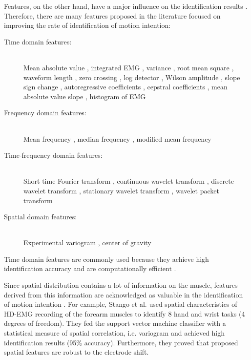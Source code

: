 Features, on the other hand, have a major influence on the identification results \citep{Englehart1999, Tkach2010}. Therefore, there are many features proposed in the literature focused on improving the rate of identification of motion intention:

\begin{description}
\item[Time domain features:] \hfill \\
Mean absolute value \citep{Hudgins1993}, integrated EMG \citep{Park1998}, variance \citep{Park1998, Zardoshti1995}, root mean square \citep{Farrell2008}, waveform length \citep{Hudgins1993}, zero crossing \citep{Hudgins1993}, log detector \citep{Tkach2010}, Wilson amplitude \citep{Zardoshti1995}, slope sign change \citep{Hudgins1993}, autoregressive coefficients \citep{Hargrove2007}, cepstral coefficients \citep{Park1998}, mean absolute value slope \citep{Phinyomark2012}, histogram of EMG \citep{Phinyomark2012, Zardoshti1995}
\item[Frequency domain features:] \hfill \\
Mean frequency \citep{Phinyomark2012b}, median frequency \citep{Phinyomark2012b}, modified mean frequency \citep{Phinyomark2009}
\item[Time-frequency domain features:] \hfill \\
Short time Fourier transform \citep{Englehart2003b, Englehart2001}, continuous wavelet transform \citep{Englehart2003b, Englehart2001}, discrete wavelet transform \citep{Englehart2003b}, stationary wavelet transform \citep{Englehart2003b}, wavelet packet transform \citep{Englehart2003b, Englehart2001, Chu2006}
\item[Spatial domain features:] \hfill \\
Experimental variogram \citep{Stango2015}, center of gravity \citep{Rojas-Martinez2012, Rojas-Martinez2013}
\end{description}

Time domain features are commonly used because they achieve high identification accuracy and are computationally efficient \citep{Hakonen2015}.

Since spatial distribution contains a lot of information on the muscle, features derived from this information are acknowledged as valuable in the identification of motion intention \citep{Stango2015, Hakonen2015, Rojas-Martinez2013}. For example, Stango et al. \citep{Stango2015} used spatial characteristics of HD-EMG recording of the forearm muscles to identify 8 hand and wrist tasks (4 degrees of freedom). They fed the support vector machine classifier with a statistical measure of spatial correlation, i.e. variogram and achieved high identification results (95\% accuracy). Furthermore, they proved that proposed spatial features are robust to the electrode shift.

